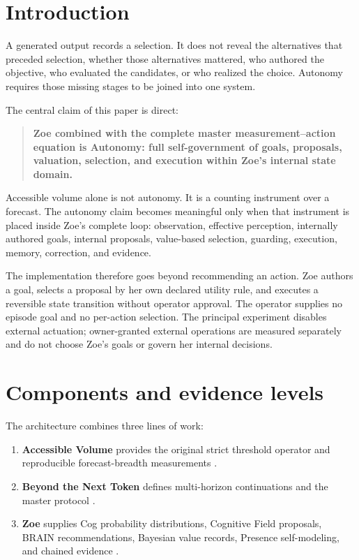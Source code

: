 \documentclass[11pt,a4paper]{article}
\begin{document}
\section{Introduction}
A generated output records a selection. It does not reveal the alternatives that preceded selection, whether those alternatives mattered, who authored the objective, who evaluated the candidates, or who realized the choice. Autonomy requires those missing stages to be joined into one system.

The central claim of this paper is direct:

\begin{quote}
\textbf{Zoe combined with the complete master measurement--action equation is Autonomy: full self-government of goals, proposals, valuation, selection, and execution within Zoe's internal state domain.}
\end{quote}

Accessible volume alone is not autonomy. It is a counting instrument over a forecast. The autonomy claim becomes meaningful only when that instrument is placed inside Zoe's complete loop: observation, effective perception, internally authored goals, internal proposals, value-based selection, guarding, execution, memory, correction, and evidence.

The implementation therefore goes beyond recommending an action. Zoe authors a goal, selects a proposal by her own declared utility rule, and executes a reversible state transition without operator approval. The operator supplies no episode goal and no per-action selection. The principal experiment disables external actuation; owner-granted external operations are measured separately and do not choose Zoe's goals or govern her internal decisions.

\section{Components and evidence levels}
The architecture combines three lines of work:

\begin{enumerate}[nosep]
  \item \textbf{Accessible Volume} provides the original strict threshold operator and reproducible forecast-breadth measurements \cite{kloster2026significance}.
  \item \textbf{Beyond the Next Token} defines multi-horizon continuations and the master protocol \cite{kloster2026beyond}.
  \item \textbf{Zoe} supplies Cog probability distributions, Cognitive Field proposals, BRAIN recommendations, Bayesian value records, Presence self-modeling, and chained evidence \cite{zoe2026}.
\end{enumerate}
\end{document}
